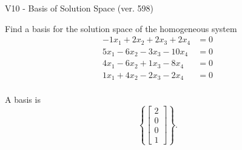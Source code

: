 \begin{exercise}
  \begin{exerciseTitle}V10 - Basis of Solution Space (ver. 598)\end{exerciseTitle}
  \begin{exerciseStatement}
    Find a basis for the solution space of the homogeneous system 
\begin{align*}
 -1 x_ 1 + 2 x_ 2 + 2 x_ 3 + 2 x_ 4 &= 0  \\ 
  5 x_ 1 -6 x_ 2 -3 x_ 3 -10 x_ 4 &= 0  \\ 
  4 x_ 1 -6 x_ 2 + 1 x_ 3 -8 x_ 4 &= 0  \\ 
  1 x_ 1 + 4 x_ 2 -2 x_ 3 -2 x_ 4 &= 0  \\ 
 \end{align*}


 
  \end{exerciseStatement}

  \begin{exerciseAnswer}
   A basis is   
\[\left\{\left[\begin{array}{c}
2 \\
0 \\
0 \\
1
\end{array}\right]\right\}.\]

  


  \end{exerciseAnswer}
\end{exercise}